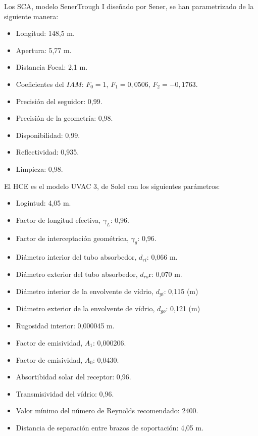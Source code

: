Los SCA, modelo SenerTrough I diseñado por Sener, se han parametrizado de la siguiente manera:

\begin{itemize}
\item
  Longitud: 148,5 m.
\item
  Apertura: 5,77 m.
\item
  Distancia Focal: 2,1 m.
\item
  Coeficientes del \(IAM\): \(F_{0}=1\), \(F_{1}=0,0506\),
  \(F_{2}=-0,1763\).
\item
  Precisión del seguidor: 0,99.
\item
  Precisión de la geometría: 0,98.
\item
  Disponibilidad: 0,99.
\item
  Reflectividad: 0,935.
\item
  Limpieza: 0,98.
\end{itemize}

El HCE es el modelo UVAC 3, de Solel con los siguientes parámetros:

\begin{itemize}

\item
  Logintud: 4,05 m.
\item
  Factor de longitud efectiva, \(\gamma_L\): 0,96.
\item
  Factor de interceptación geométrica, \(\gamma_g\): 0,96.
\item
  Diámetro interior del tubo absorbedor, \(d_{ri}\): 0,066 m.
\item
  Diámetro exterior del tubo absorbedor, \(d_{ro}\)r: 0,070 m.
\item
  Diámetro interior de la envolvente de vídrio, \(d_{gi}\): 0,115 (m)
\item
  Diámetro exterior de la envolvente de vídrio, \(d_{go}\): 0,121 (m)
\item
  Rugosidad interior: 0,000045 m.
\item
  Factor de emisividad, \(A_1\): 0,000206.
\item
  Factor de emisividad, \(A_0\): 0,0430.
\item
  Absortibidad solar del receptor: 0,96.
\item
  Transmisividad del vídrio: 0,96.
\item
  Valor mínimo del número de Reynolds recomendado: 2400.
\item
  Distancia de separación entre brazos de soportación: 4,05 m.
\end{itemize}

